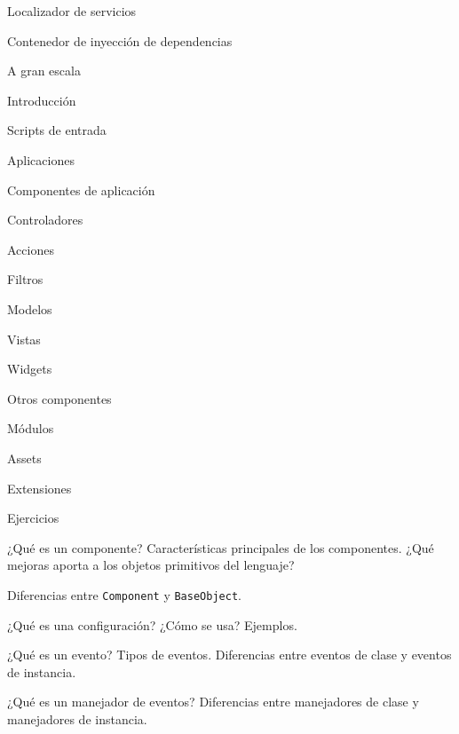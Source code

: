 \begin{longenum}
\begin{longenum}
\begin{longenum}
            \item Localizador de servicios
            \item Contenedor de inyección de dependencias
        \end{longenum}
        \item A gran escala
        \begin{longenum}
            \item Introducción
            \item Scripts de entrada
            \item Aplicaciones
            \item Componentes de aplicación
            \item Controladores
            \begin{longenum}
                \item Acciones
                \item Filtros
            \end{longenum}
            \item Modelos
            \item Vistas
            \begin{longenum}
                \item Widgets
            \end{longenum}
            \item Otros componentes
            \begin{longenum}
                \item Módulos
                \item Assets
                \item Extensiones
            \end{longenum}
        \end{longenum}
        \item Ejercicios
        \begin{longenum}
            \item ¿Qué es un componente? Características principales de los componentes. ¿Qué mejoras aporta a los objetos primitivos del lenguaje?
            \item Diferencias entre \texttt{Component} y \texttt{BaseObject}.
            \item ¿Qué es una configuración? ¿Cómo se usa? Ejemplos.
            \item ¿Qué es un evento? Tipos de eventos. Diferencias entre eventos de clase y eventos de instancia.
            \item ¿Qué es un manejador de eventos? Diferencias entre manejadores de clase y manejadores de instancia.

\end{longenum}
\end{longenum}
\end{longenum}
